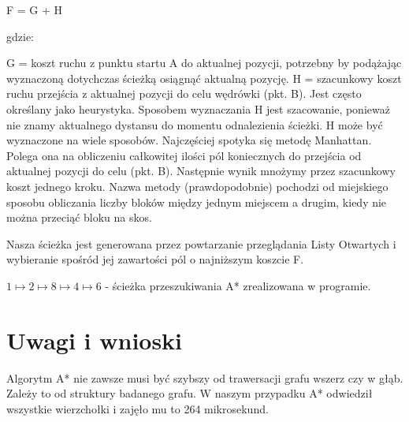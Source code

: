 \documentclass[12pt,a4paper]{article}
\begin{document}
F = G + H\newline 

gdzie:\newline

    G = koszt ruchu z punktu startu A do aktualnej pozycji, potrzebny by podążając wyznaczoną dotychczas ścieżką osiągnąć aktualną pozycję. \newline
    H = szacunkowy koszt ruchu przejścia z aktualnej pozycji do celu wędrówki (pkt. B). Jest często określany jako heurystyka. Sposobem wyznaczania H jest szacowanie, ponieważ nie znamy aktualnego dystansu do momentu odnalezienia ścieżki. H może być wyznaczone na wiele sposobów. Najczęściej spotyka się metodę Manhattan. Polega ona na obliczeniu całkowitej ilości pól koniecznych do przejścia od aktualnej pozycji do celu (pkt. B). Następnie wynik mnożymy przez szacunkowy koszt jednego kroku. Nazwa metody (prawdopodobnie) pochodzi od miejskiego sposobu obliczania liczby bloków między jednym miejscem a drugim, kiedy nie można przeciąć bloku na skos.\newline

Nasza ścieżka jest generowana przez powtarzanie przeglądania Listy Otwartych i wybieranie spośród jej zawartości pól o najniższym koszcie F. \newline

$ 1 \mapsto 2 \mapsto 8 \mapsto 4 \mapsto 6 $ - ścieżka przeszukiwania A* zrealizowana w programie. \newline

\section*{Uwagi i wnioski}
Algorytm A* nie zawsze musi być szybszy od trawersacji grafu wszerz czy w głąb. Zależy to od struktury badanego grafu. W naszym przypadku A* odwiedził wszystkie wierzchołki i zajęło mu to 264 mikrosekund.
\end{document}
